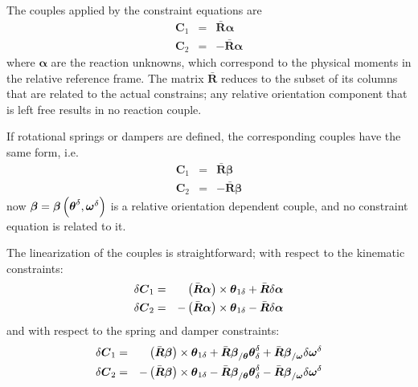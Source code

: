 \documentclass[10pt,dvips,fleqn]{report}
\newcommand{\T}[1]{\boldsymbol{#1}}
\begin{document}
\noindent
The couples applied by the constraint equations are
\begin{eqnarray*}
	\T{C}_1 & = & \bar{\T{R}} \T{\alpha} \\
	\T{C}_2 & = & - \bar{\T{R}} \T{\alpha}
\end{eqnarray*}
where $\T{\alpha}$ are the reaction unknowns, which correspond 
to the physical moments in the relative reference frame.
The matrix $\bar{\T{R}}$ reduces to the subset of its columns 
that are related to the actual constrains; any relative orientation 
component that is left free results in no reaction couple.

\noindent
If rotational springs or dampers are defined, the corresponding
couples have the same form, i.e.\
\begin{eqnarray*}
	\T{C}_1 & = & \bar{\T{R}} \T{\beta} \\
	\T{C}_2 & = & - \bar{\T{R}} \T{\beta}
\end{eqnarray*}
now $\T{\beta}=\T{\beta}\plbr{\T{\theta}^{\delta},\T{\omega}^{\delta}}$ 
is a relative orientation dependent couple, and no constraint equation
is related to it.

The linearization of the couples is straightforward; with respect
to the kinematic constraints:
\begin{eqnarray*}
	\delta\T{C}_1 & = &
	\plbr{\bar{\T{R}} \T{\alpha}}\times\T{\theta}_{1\delta}
	+ \bar{\T{R}} \delta\T{\alpha} \\
	\delta\T{C}_2 & = &
	- \plbr{\bar{\T{R}} \T{\alpha}}\times\T{\theta}_{1\delta}
	- \bar{\T{R}} \delta\T{\alpha}
\end{eqnarray*}
and with respect to the spring and damper constraints:
\begin{eqnarray*}
	\delta\T{C}_1 & = &
	\plbr{\bar{\T{R}} \T{\beta}}\times\T{\theta}_{1\delta}
	+ \bar{\T{R}}\T{\beta}_{/\T{\theta}} \T{\theta}^{\delta}_{\delta}
	+ \bar{\T{R}}\T{\beta}_{/\T{\omega}} \delta\T{\omega}^{\delta} \\
	\delta\T{C}_2 & = &
	- \plbr{\bar{\T{R}} \T{\beta}}\times\T{\theta}_{1\delta}
	- \bar{\T{R}}\T{\beta}_{/\T{\theta}} \T{\theta}^{\delta}_{\delta}
	- \bar{\T{R}}\T{\beta}_{/\T{\omega}} \delta\T{\omega}^{\delta}
\end{eqnarray*}
\end{document}
